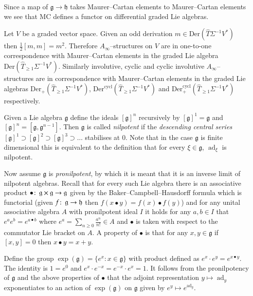 \documentclass[british]{amsart}
\theoremstyle{plain}
\theoremstyle{definition}
{
\newaliascnt{{definition}}{theorem}\newtheorem{{definition}}[{definition}]{{Definition}}\aliascntresetthe{{definition}}\expandafterautorefname\endcsname{{Definition}}}
{
\newaliascnt{{remark}}{theorem}\newtheorem{{remark}}[{remark}]{{Remark}}\aliascntresetthe{{remark}}\expandafterautorefname\endcsname{{Remark}}}
{
\newaliascnt{{example}}{theorem}\newtheorem{{example}}[{example}]{{Example}}\aliascntresetthe{{example}}\expandafterautorefname\endcsname{{Example}}}
{
\newaliascnt{{examples}}{theorem}\newtheorem{{examples}}[{examples}]{{Examples}}\aliascntresetthe{{examples}}\expandafterautorefname\endcsname{{Examples}}}
{
\newaliascnt{{notation}}{theorem}\newtheorem{{notation}}[{notation}]{{Notation}}\aliascntresetthe{{notation}}\expandafterautorefname\endcsname{{Notation}}}
{
\newaliascnt{{convention}}{theorem}\newtheorem{{convention}}[{convention}]{{Convention}}\aliascntresetthe{{convention}}\expandafterautorefname\endcsname{{Convention}}}
\numberwithin{equation}{section}
\numberwithin{figure}{section}
\begin{document}
Since a map of $\mathfrak{g}\rightarrow\mathfrak{h}$ takes Maurer--Cartan elements to Maurer--Cartan elements we see that ${\mathrm{MC}}$ defines a functor on differential graded Lie algebras.

\begin{example}
Let $V$ be a graded vector space. Given an odd derivation $m\in{\mathrm{Der}}(\widehat{T}\Sigma^{-1}V^*)$ then $\frac{1}{2}[m,m]=m^2$. Therefore $A_\infty$--structures on $V$ are in one-to-one correspondence with Maurer--Cartan elements in the graded Lie algebra ${\mathrm{Der}}(\widehat{T}_{\geq 1}\Sigma^{-1}V^*)$. Similarly involutive, cyclic and cyclic involutive $A_\infty$--structures are in correspondence with Maurer--Cartan elements in the graded Lie algebras ${\mathrm{Der}}_+(\widehat{T}_{\geq 1}\Sigma^{-1}V^*)$, ${\mathrm{Der}}^{\mathrm{cycl}}(\widehat{T}_{\geq 1}\Sigma^{-1}V^*)$ and ${\mathrm{Der}}^{\mathrm{cycl}}_+(\widehat{T}_{\geq 1}\Sigma^{-1}V^*)$ respectively.
\end{example}

Given a Lie algebra $\mathfrak{g}$ define the ideals $[\mathfrak{g}]^n$ recursively by $[\mathfrak{g}]^1 = \mathfrak{g}$ and $[\mathfrak{g}]^{n} = [\mathfrak{g},\mathfrak{g}^{n-1}]$. Then $\mathfrak{g}$ is called \emph{nilpotent} if the \emph{descending central series} $[\mathfrak{g}]^1\supset [\mathfrak{g}]^2\supset [\mathfrak{g}]^3\supset\dots$ stabilises at $0$. Note that in the case $\mathfrak{g}$ is finite dimensional this is equivalent to the definition that for every $\xi\in\mathfrak{g}$, $\operatorname{ad}_\xi$ is nilpotent.

Now assume $\mathfrak{g}$ is \emph{pronilpotent}, by which it is meant that it is an inverse limit of nilpotent algebras. Recall that for every such Lie algebra there is an associative product $\bullet{\colon\thinspace}\mathfrak{g}\times\mathfrak{g}\rightarrow \mathfrak{g}$ given by the Baker--Campbell--Hausdorff formula which is functorial (given $f{\colon\thinspace}\mathfrak{g}\rightarrow\mathfrak{h}$ then $f(x\bullet y) = f(x)\bullet f(y)$) and for any unital associative algebra $A$ with pronilpotent ideal $I$ it holds for any $a,b\in I$ that $e^a e^b = e^{a\bullet b}$ where $e^a = \sum_{n\geq 0} \frac{a^n}{n!}\in A$ and $\bullet$ is taken with respect to the commutator Lie bracket on $A$. A property of $\bullet$ is that for any $x,y\in\mathfrak{g}$ if $[x,y]=0$ then $x\bullet y = x + y$.

Define the group $\exp(\mathfrak{g}) = \{e^x : x\in\mathfrak{g} \}$ with product defined as $e^x\cdot e^y = e^{x\bullet y}$. The identity is $1=e^0$ and $e^x\cdot e^{-x} = e^{-x}\cdot e^{x} = 1$. It follows from the pronilpotency of $\mathfrak{g}$ and the above properties of $\bullet$ that the adjoint representation $y\mapsto \operatorname{ad}_y$ exponentiates to an action of $\exp(\mathfrak{g})$ on $\mathfrak{g}$ given by $e^y\mapsto e^{\operatorname{ad}_y}$.
\end{document}
